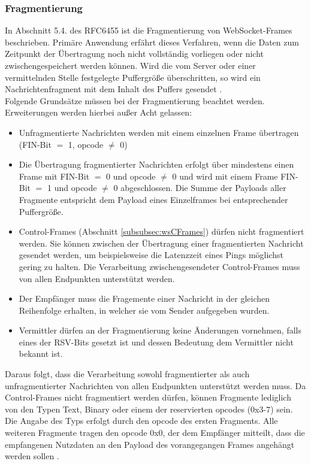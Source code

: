 \documentclass[11pt,a4paper,titlepage]{scrartcl}
\numberwithin{equation}{section}
\begin{document}
\subsubsection*{Fragmentierung}\label{subsubsec:wsFragment}
In Abschnitt 5.4. des RFC6455 ist die Fragmentierung von WebSocket-Frames beschrieben. Primäre Anwendung erfährt dieses Verfahren, wenn die Daten zum Zeitpunkt der Übertragung noch nicht vollständig vorliegen oder nicht zwischengespeichert werden können. Wird die vom Server oder einer vermittelnden Stelle festgelegte Puffergröße überschritten, so wird ein Nachrichtenfragment mit dem Inhalt des Puffers gesendet \autocite[32]{fette_websocket_2011}.\\

\noindent Folgende Grundsätze müssen bei der Fragmentierung beachtet werden. Erweiterungen werden hierbei außer Acht gelassen:
\begin{itemize}
	\item Unfragmentierte Nachrichten werden mit einem einzelnen Frame übertragen (FIN-Bit $=$ 1,  opcode $\neq$ 0)  
	\item Die Übertragung fragmentierter Nachrichten erfolgt über mindestens einen Frame mit FIN-Bit $=$ 0 und opcode $\neq$ 0 und wird mit einem Frame FIN-Bit $=$ 1 und opcode $\neq$ 0 abgeschlossen. Die Summe der Payloads aller Fragmente entspricht dem Payload eines Einzelframes bei entsprechender Puffergröße.
	\item Control-Frames (Abschnitt \ref{subsubsec:wsCFrames}) dürfen nicht fragmentiert werden. Sie können zwischen der Übertragung einer fragmentierten Nachricht gesendet werden, um beispielsweise die Latenzzeit eines Pings möglichst gering zu halten. Die Verarbeitung zwischengesendeter Control-Frames muss von allen Endpunkten unterstützt werden.
	\item Der Empfänger muss die Fragemente einer Nachricht in der gleichen Reihenfolge erhalten, in welcher sie vom Sender aufgegeben wurden.
	\item Vermittler dürfen an der Fragmentierung keine Änderungen vornehmen, falls eines der RSV-Bits gesetzt ist und dessen Bedeutung dem Vermittler nicht bekannt ist.
\end{itemize}

\noindent Daraus folgt, dass die Verarbeitung sowohl fragmentierter als auch unfragmentierter Nachrichten von allen Endpunkten unterstützt werden muss. Da Control-Frames nicht fragmentiert werden dürfen, können Fragmente lediglich von den Typen Text, Binary oder einem der reservierten opcodes (0x3-7) sein. Die Angabe des Typs erfolgt durch den opcode des ersten Fragments. Alle weiteren Fragmente tragen den opcode 0x0, der dem Empfänger mitteilt, dass die empfangenen Nutzdaten an den Payload des vorangegangen Frames angehängt werden sollen \autocite{shepherd_writing_2017}.
\end{document}
